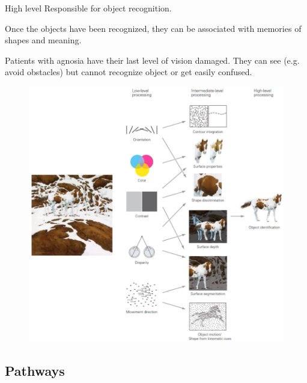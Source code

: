 \begin{description}
\begin{descriptionlist}
            \item[High level] 
                Responsible for object recognition.
                
                Once the objects have been recognized, they can be associated with memories of shapes and meaning.

                \begin{casestudy}[Agnosia]
                    Patients with agnosia have their last level of vision damaged.
                    They can see (e.g. avoid obstacles) but cannot recognize object or get easily confused.
                \end{casestudy}
        \end{descriptionlist}

        \begin{figure}[H]
            \centering
            \includegraphics[width=0.6\linewidth]{./img/vision_levels.png}
        \end{figure}
\end{description}



\subsection{Pathways}


